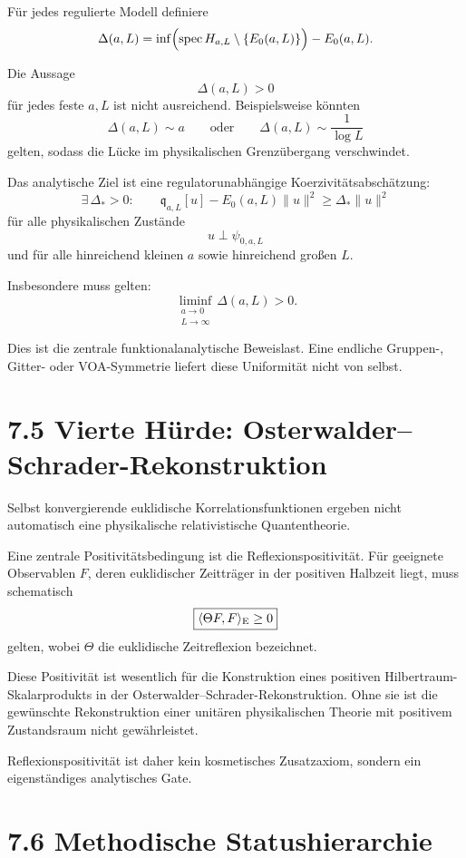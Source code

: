 \documentclass[11pt,a4paper]{article}
\begin{document}
Für jedes regulierte Modell definiere
\[
\Delta(a,L)
=
\inf\Bigl(
\operatorname{spec}H_{a,L}\setminus\{E_0(a,L)\}
\Bigr)
-
E_0(a,L).
\]

Die Aussage
\[
\Delta(a,L)>0
\]
für jedes feste $a,L$ ist nicht ausreichend. Beispielsweise könnten
\[
\Delta(a,L)\sim a
\qquad\text{oder}\qquad
\Delta(a,L)\sim\frac{1}{\log L}
\]
gelten, sodass die Lücke im physikalischen Grenzübergang verschwindet.

Das analytische Ziel ist eine regulatorunabhängige Koerzivitätsabschätzung:
\[
\boxed{
\exists\,\Delta_*>0:\qquad
\mathfrak q_{a,L}[u]
-
E_0(a,L)\|u\|^2
\ge
\Delta_*\|u\|^2
}
\]
für alle physikalischen Zustände
\[
u\perp\psi_{0,a,L}
\]
und für alle hinreichend kleinen $a$ sowie hinreichend großen $L$.

Insbesondere muss gelten:
\[
\boxed{
\liminf_{\substack{a\to0\\L\to\infty}}
\Delta(a,L)>0.
}
\]

Dies ist die zentrale funktionalanalytische Beweislast. Eine endliche
Gruppen-, Gitter- oder VOA-Symmetrie liefert diese Uniformität nicht von selbst.

\section*{7.5 Vierte Hürde: Osterwalder--Schrader-Rekonstruktion}

Selbst konvergierende euklidische Korrelationsfunktionen ergeben nicht
automatisch eine physikalische relativistische Quantentheorie.

Eine zentrale Positivitätsbedingung ist die Reflexionspositivität. Für geeignete
Observablen $F$, deren euklidischer Zeitträger in der positiven Halbzeit liegt,
muss schematisch
\[
\boxed{
\langle \Theta F,F\rangle_{\rm E}\ge0
}
\]
gelten, wobei $\Theta$ die euklidische Zeitreflexion bezeichnet.

Diese Positivität ist wesentlich für die Konstruktion eines
positiven Hilbertraum-Skalarprodukts in der Osterwalder--Schrader-Rekonstruktion.
Ohne sie ist die gewünschte Rekonstruktion einer unitären physikalischen
Theorie mit positivem Zustandsraum nicht gewährleistet.

Reflexionspositivität ist daher kein kosmetisches Zusatzaxiom, sondern ein
eigenständiges analytisches Gate.


\section*{7.6 Methodische Statushierarchie}
\end{document}
